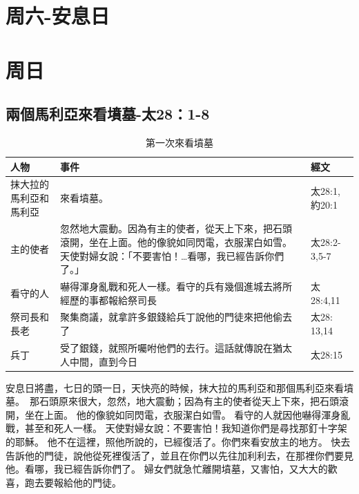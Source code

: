 \section{周六-安息日}
\section{周日}
\subsection{兩個馬利亞來看墳墓-太28：1-8}
\begin{table}[htbp]
  \centering
    \begin{tabular}{|l|l|l|}
    \toprule
    \multicolumn{1}{|p{6.645em}|}{\textbf{人物}} 
    & \multicolumn{1}{p{25.43em}|}{\textbf{事件}} 
    & \multicolumn{1}{p{5.57em}|}{\textbf{經文}} \\
    \midrule
      抹大拉的馬利亞和馬利亞  & 來看墳墓。 & 太28:1,約20:1 \\
  \midrule      
 主的使者 
 & \multicolumn{1}{p{25.43em}|}{ 忽然地大震動。因為有主的使者，從天上下來，把石頭滾開，坐在上面。他的像貌如同閃電，衣服潔白如雪。天使對婦女說：「不要害怕！…看哪，我已經告訴你們了。」 }&太28:2-3,5-7 \\
 \midrule   
看守的人
& \multicolumn{1}{p{25.43em}|}{嚇得渾身亂戰和死人一樣。看守的兵有幾個進城去將所經歷的事都報給祭司長} & 太28:4,11 \\
\midrule 
 祭司長和長老& \multicolumn{1}{p{25.43em}|}{聚集商議，就拿許多銀錢給兵丁說他的門徒來把他偷去了}  & 太28: 13,14 \\
 \midrule 
兵丁  & \multicolumn{1}{p{25.43em}|}{受了銀錢，就照所囑咐他們的去行。這話就傳說在猶太人中間，直到今日} 
& 太28:15 \\
    \bottomrule
    \end{tabular}%
     \caption{第一次來看墳墓}
  \label{tab:addlabel}%
\end{table}
安息日將盡，七日的頭一日，天快亮的時候，抹大拉的馬利亞和那個馬利亞來看墳墓。
 那石頭原來很大，忽然，地大震動；因為有主的使者從天上下來，把石頭滾開，坐在上面。
他的像貌如同閃電，衣服潔白如雪。
看守的人就因他嚇得渾身亂戰，甚至和死人一樣。
天使對婦女說：不要害怕！我知道你們是尋找那釘十字架的耶穌。
他不在這裡，照他所說的，已經復活了。你們來看安放主的地方。
快去告訴他的門徒，說他從死裡復活了，並且在你們以先往加利利去，在那裡你們要見他。看哪，我已經告訴你們了。
婦女們就急忙離開墳墓，又害怕，又大大的歡喜，跑去要報給他的門徒。

